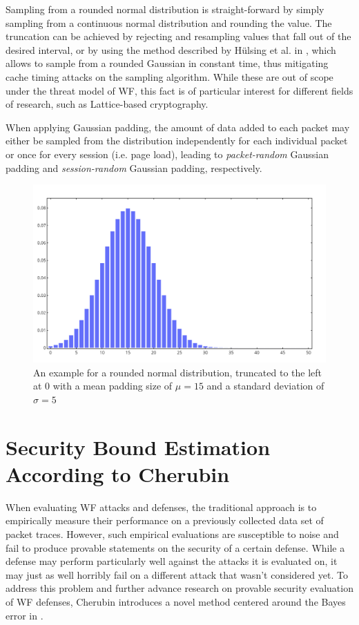 \documentclass[
	ruledheaders=chapter,
	class=report,
	thesis={type=master, department=inf},
	accentcolor=1c,
	custommargins=true,
	marginpar=false,
	parskip=half-,
	fontsize=11pt,
]{tudapub}
\begin{document}
	Sampling from a rounded normal distribution is straight-forward by simply sampling from a continuous normal distribution and rounding the value. The truncation can be achieved by rejecting and resampling values that fall out of the desired interval, or by using the method described by Hülsing et al. in \cite{Huelsing2018}, which allows to sample from a rounded Gaussian in constant time, thus mitigating cache timing attacks on the sampling algorithm. While these are out of scope under the threat model of WF, this fact is of particular interest for different fields of research, such as Lattice-based cryptography. \cite{Huelsing2018}
	
	When applying Gaussian padding, the amount of data added to each packet may either be sampled from the distribution independently for each individual packet or once for every session (i.e. page load), leading to \textit{packet-random} Gaussian padding and \textit{session-random} Gaussian padding, respectively.
	
	\begin{figure}[tb]
		\centering
		\includegraphics[width=\textwidth]{truncated_rounded_normal.png}
		\caption{An example for a rounded normal distribution, truncated to the left at 0 with a mean padding size of $\mu = 15$ and a standard deviation of $\sigma = 5$ }
		\label{fig:trunc_gauss}
	\end{figure}
	
	\section{Security Bound Estimation According to Cherubin \cite{Cherubin2017}}
	\label{cherubin_bounds}
	
	When evaluating WF attacks and defenses, the traditional approach is to empirically measure their performance on a previously collected data set of packet traces. However, such empirical
	evaluations are susceptible to noise and fail to produce provable statements on the security of
	a certain defense. While a defense may perform particularly well against the attacks it is evaluated on, it may just as well horribly fail on a different attack that wasn't considered yet. To address this problem and further advance research on provable security evaluation of WF defenses, Cherubin introduces a novel method centered around the Bayes error in \cite{Cherubin2017}.
	
\end{document}
